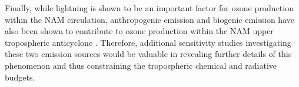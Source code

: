 Finally, while lightning is shown to be an important factor for ozone
production within the NAM circulation, anthropogenic emission and
biogenic emission have also been shown to contribute to ozone production
within the NAM upper tropospheric anticyclone \citep{Li:2005ss}. Therefore, additional
sensitivity studies investigating these two emission sources would
be valuable in revealing further details of this phenomenon and
thus constraining the tropospheric chemical and radiative budgets.
